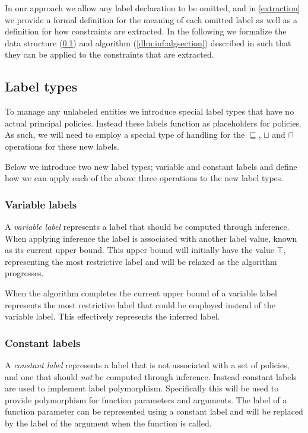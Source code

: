In our approach we allow any label declaration to be omitted, and in \cref{extraction} we provide a formal definition for the meaning of each omitted label as well as a definition for how constraints are extracted.
In the following we formalize the data structure (\cref{dlm:inf:types}) and algorithm (\cref{dlm:inf:algsection}) described in \cite{myers1997} such that they can be applied to the constraints that are extracted.

\subsection{Label types}\label{dlm:inf:types}
To manage any unlabeled entities we introduce special label types that have no actual principal policies.
Instead these labels function as placeholders for policies.
As such, we will need to employ a special type of handling for the $\sqsubseteq$, $\sqcup$ and $\sqcap$ operations for these new labels.

Below we introduce two new label types; variable and constant labels and define how we can apply each of the above three operations to the new label types.

\subsubsection{Variable labels}
A \emph{variable label} represents a label that should be computed through inference.
When applying inference the label is associated with another label value, known as its current upper bound.
This upper bound will initially have the value $\top$, representing the most restrictive label and will be relaxed as the algorithm progresses.

When the algorithm completes the current upper bound of a variable label represents the most restrictive label that could be employed instead of the variable label.
This effectively represents the inferred label.

\subsubsection{Constant labels}
A \textit{constant label} represents a label that is not associated with a set of policies, and one that should \textit{not} be computed through inference.
Instead constant labels are used to implement label polymorphism.
Specifically this will be used to provide polymorphism for function parameters and arguments.
The label of a function parameter can be represented using a constant label and will be replaced by the label of the argument when the function is called.

